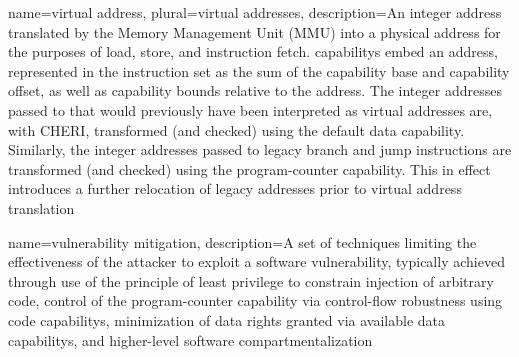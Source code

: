 {
  name=virtual address,
  plural=virtual addresses,
  description={An integer \gls{address} translated by the Memory Management
    Unit (MMU) into a \gls{physical address} for the purposes of load, store,
    and instruction fetch.
    \Glspl{capability} embed an address, represented in the instruction
    set as the sum of the \gls{capability base} and \gls{capability offset},
    as well as \gls{capability bounds} relative to the address.
    The integer addresses passed to  that would previously have been interpreted as
    virtual addresses are, with CHERI, transformed (and checked) using the
    \gls{default data capability}.
    Similarly, the integer addresses passed to legacy branch and jump
    instructions are transformed (and checked) using the \gls{program-counter
    capability}.
    This in effect introduces a further relocation of legacy addresses prior
    to virtual address translation}
}

{
  name=vulnerability mitigation,
  description={A set of techniques limiting the effectiveness of the attacker
    to exploit a software vulnerability, typically achieved through use of
    the \gls{principle of least privilege} to constrain injection of
    arbitrary code, control of the \gls{program-counter capability} via
    \gls{control-flow robustness} using \glspl{code capability}, minimization of
    data rights granted via available \glspl{data capability}, and higher-level
    \gls{software compartmentalization}}
}
